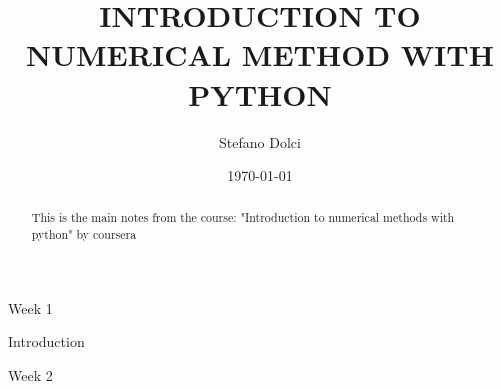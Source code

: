 \documentclass{article}
\begin{document}
\title{INTRODUCTION TO NUMERICAL METHOD WITH PYTHON}
\author{Stefano Dolci}
\date{\today}
\maketitle


\begin{abstract}

This is the main notes from the course:
"Introduction to numerical methods with python" by coursera 
\end{abstract} 


\tableofcontents

\begin{section}{Week 1}
\begin{subsection}{Introduction}



\end{subsection}

\end{section}

\begin{section}{Week 2}

    
\end{section}
\end{document}
